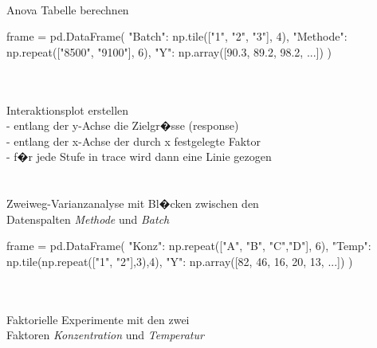 \documentclass{article}
\begin{document}
\begin{multicols*}{3}
 \\
Anova Tabelle berechnen

\begin{tcolorbox}[boxrule=1pt,colback=black!4!white, title=\underline{\textbf{DataFrame f�r die n�chsten Befehle}},colframe=black!4!white,coltitle=black]
\begin{python}
frame = pd.DataFrame({
  "Batch": np.tile(["1", "2", "3"], 4),
  "Methode": np.repeat(["8500", "9100"], 6),
  "Y": np.array([90.3, 89.2, 98.2, ...])
})
\end{python}
\end{tcolorbox}

\\
 \\
Interaktionsplot erstellen \\
- entlang der y-Achse die Zielgr�sse (response) \\
- entlang der x-Achse der durch x festgelegte Faktor \\
- f�r jede Stufe in trace wird dann eine Linie gezogen \\

 \\
 \\
Zweiweg-Varianzanalyse mit Bl�cken zwischen den \\
Datenspalten \textit{Methode} und \textit{Batch} \\

\begin{tcolorbox}[boxrule=1pt,colback=black!4!white, title=\underline{\textbf{DataFrame f�r die n�chsten Befehle}},colframe=black!4!white,coltitle=black]
\begin{python}
frame = pd.DataFrame({
  "Konz": np.repeat(["A", "B", "C","D"], 6),
  "Temp": np.tile(np.repeat(["1", "2"],3),4),
  "Y": np.array([82, 46, 16, 20, 13, ...])
})
\end{python}
\end{tcolorbox}

 \\
 \\
Faktorielle Experimente mit den zwei \\
Faktoren \textit{Konzentration} und \textit{Temperatur}\\


\end{multicols*}
\end{document}
